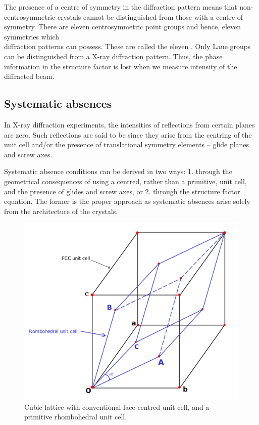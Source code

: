 	The presence of a centre of symmetry in the diffraction pattern means that non- centrosymmetric crystals cannot be distinguished from those with a centre of symmetry. There are eleven centrosymmetric point groups and hence, eleven symmetries which \\diffraction patterns can possess. These are called the eleven . Only Laue groups can be distinguished from a X-ray diffraction pattern. Thus, the phase information in the structure factor is lost when we measure intensity of the diffracted beam.


\subsection{Systematic absences}

	In X-ray diffraction experiments, the intensities of reflections from certain planes are zero. Such reflections are said to be  since they arise from the centring of the unit cell and/or the presence of translational symmetry elements -- glide planes and screw axes.
	
	Systematic absence conditions can be derived in two ways: 1. through the geometrical consequences of using a centred, rather than a primitive, unit cell, and the presence of glides and screw axes, or 2. through the structure factor equation. The former is the proper approach as systematic absences arise solely from the architecture of the crystals.
	
	\begin{figure}
	\centering
	\includegraphics[scale=0.15]{fcc_lattice.png}
	\caption{\label{fig:fcc_fr}Cubic lattice with conventional face-centred unit cell, and a primitive rhombohedral unit cell.}
	\end{figure}
	
